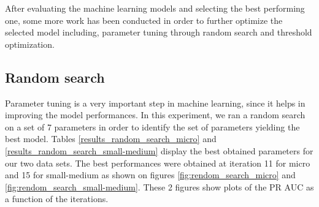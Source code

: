 \documentclass[LaM,binding=0.6cm, english]{sapthesis}
\begin{document}
After evaluating the machine learning models and selecting the best performing one, some more work has been conducted in order to further optimize the selected model including, parameter tuning through random search and threshold optimization. 

\subsection{Random search}

Parameter tuning is a very important step in machine learning, since it helps in improving the model performances. In this experiment, we ran a random search on a set of 7 parameters in order to identify the set of parameters yielding the best model. Tables \ref{results_random_search_micro} and \ref{results_random_search_small-medium} display the best obtained parameters for our two data sets. The best performances were obtained at iteration 11 for micro and 15 for small-medium as shown on figures \ref{fig:rendom_search_micro} and \ref{fig:rendom_search_small-medium}. These 2 figures show plots of the PR AUC as a function of the iterations.

\begin{table}[!ht]
\end{table}
\end{document}
